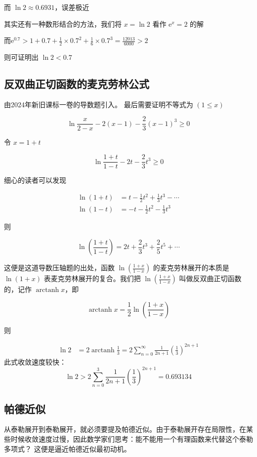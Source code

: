\documentclass[12pt]{article}
\theoremstyle{definition}
\theoremstyle{plain}
\theoremstyle{definition}
\newcommand{\ee}{\mathrm{e}}
\begin{document}
而 $\ln 2 \approx 0.6931$，误差极近

其实还有一种数形结合的方法，我们将 \(x=\ln 2\) 看作 \(\ee^{x}=2\) 的解

而\(\ee^{0.7} > 1 + 0.7 + \frac{1}{2} \times {0.7}^{2} + \frac{1}{6} \times {0.7}^{3} = \frac{12013}{6000} > 2\)

则可证明出 \(\ln 2 < 0.7\)

\subsection{反双曲正切函数的麦克劳林公式}
由2024年新旧课标一卷的导数题引入。 最后需要证明不等式为 \((1 \leq x)\)

\[\ln\frac{x}{2 - x} - 2(x - 1) - \frac{2}{3}(x - 1)^{3} \geq 0\]

令 \(x = 1 + t\)

\[\ln\frac{1 + t}{1 - t} - 2t - \frac{2}{3}t^{3} \geq 0\]

细心的读者可以发现

\begin{align*}
\ln(1 + t) &= t - \frac{1}{2}t^{2} + \frac{1}{3}t^{3} - \cdots \\
\ln(1 - t) &= -t - \frac{1}{2}t^{2} - \frac{1}{3}t^{3}
\end{align*}

则

\[\ln\left( \frac{1 + t}{1 - t} \right) = 2t + \frac{2}{3}t^{3} + \frac{2}{5}t^{5} + \cdots\]

这便是这道导数压轴题的出处，函数
\(\ln\left( \frac{1 + x}{1 - x} \right)\) 的麦克劳林展开的本质是
\(\ln(1 + x)\) 表麦克劳林展开的复合。我们把
\(\ln\left( \frac{1 + x}{1 - x} \right)\) 叫做反双曲正切函数的，记作
\(\operatorname{arctanh}x\)，即

\[\operatorname{arctanh}x = \frac{1}{2}\ln\left( \frac{1 + x}{1 - x} \right)\]

则

\begin{align*}
\ln 2 &= 2\operatorname{arctanh}\frac{1}{3} = 2\sum_{n = 0}^{\infty}\frac{1}{2n + 1}\left( \frac{1}{3} \right)^{2n + 1}
\end{align*}
此式收敛速度较快：
\[\ln 2 > 2\sum_{n = 0}^{3}\frac{1}{2n + 1}\left( \frac{1}{3} \right)^{2n + 1} = 0.693134\]

\subsection{帕德近似}

从泰勒展开到泰勒展开，就必须要提及帕德近似。由于泰勒展开存在局限性，在某些时候收敛速度过慢，因此数学家们思考：能不能用一个有理函数来代替这个泰勒多项式？
这便是逼近帕德近似最初动机。
\end{document}
